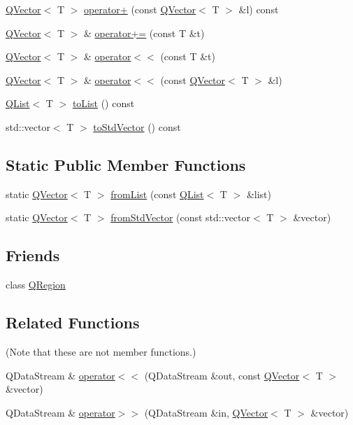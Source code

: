 \begin{DoxyCompactItemize}
\item 
\hyperlink{class_q_vector}{Q\+Vector}$<$ T $>$ \hyperlink{class_q_vector_a8f2255fa151633ab15cd46a1ea9d8bf1}{operator+} (const \hyperlink{class_q_vector}{Q\+Vector}$<$ T $>$ \&l) const 
\item 
\hyperlink{class_q_vector}{Q\+Vector}$<$ T $>$ \& \hyperlink{class_q_vector_a7597c1f0f004594f8e446bb6ae09601c}{operator+=} (const T \&t)
\item 
\hyperlink{class_q_vector}{Q\+Vector}$<$ T $>$ \& \hyperlink{class_q_vector_a60144939301f38042c9f702ae887ea16}{operator$<$$<$} (const T \&t)
\item 
\hyperlink{class_q_vector}{Q\+Vector}$<$ T $>$ \& \hyperlink{class_q_vector_a36aa335f06fab320bc322cb817808a34}{operator$<$$<$} (const \hyperlink{class_q_vector}{Q\+Vector}$<$ T $>$ \&l)
\item 
\hyperlink{class_q_list}{Q\+List}$<$ T $>$ \hyperlink{class_q_vector_a604c990aa7914fc3840c740b4bb0ff7d}{to\+List} () const 
\item 
std\+::vector$<$ T $>$ \hyperlink{class_q_vector_a0bb56bf3c3e5c533efda20ff4394b444}{to\+Std\+Vector} () const 
\end{DoxyCompactItemize}
\subsection*{Static Public Member Functions}
\begin{DoxyCompactItemize}
\item 
static \hyperlink{class_q_vector}{Q\+Vector}$<$ T $>$ \hyperlink{class_q_vector_a81688755b0166749fde54c1108690825}{from\+List} (const \hyperlink{class_q_list}{Q\+List}$<$ T $>$ \&list)
\item 
static \hyperlink{class_q_vector}{Q\+Vector}$<$ T $>$ \hyperlink{class_q_vector_a4bb034c193b1f443b235df30323ee2d0}{from\+Std\+Vector} (const std\+::vector$<$ T $>$ \&vector)
\end{DoxyCompactItemize}
\subsection*{Friends}
\begin{DoxyCompactItemize}
\item 
class \hyperlink{class_q_vector_a3c463c91639ee085a365c4bf70fcbe31}{Q\+Region}
\end{DoxyCompactItemize}
\subsection*{Related Functions}
(Note that these are not member functions.) \begin{DoxyCompactItemize}
\item 
Q\+Data\+Stream \& \hyperlink{class_q_vector_a556a703e2a1987feda15598f2d097d34}{operator$<$$<$} (Q\+Data\+Stream \&out, const \hyperlink{class_q_vector}{Q\+Vector}$<$ T $>$ \&vector)
\item 
Q\+Data\+Stream \& \hyperlink{class_q_vector_aa3718549b9b553556b654f6e00aaa914}{operator$>$$>$} (Q\+Data\+Stream \&in, \hyperlink{class_q_vector}{Q\+Vector}$<$ T $>$ \&vector)
\end{DoxyCompactItemize}


